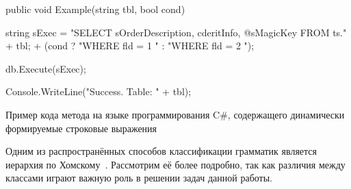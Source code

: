 \begin{listing}
    \begin{pyglist}[language=csharp,numbers=left,numbersep=5pt]

public void Example(string tbl, bool cond)
{
    string sExec =
        "SELECT sOrderDescription, cderitInfo, @sMagicKey FROM ts."
        + tbl;
        + (cond ? "WHERE fld = 1 " : "WHERE fld = 2 ");

    db.Execute(sExec);
    
    Console.WriteLine("Success. Table: " + tbl);
}
\end{pyglist}
\caption{Пример кода метода на языке программирования C\#, содержащего динамически формируемые строковые выражения}
\label{lst:stringExpr}
\end{listing}

Одним из распространённых способов классификации грамматик является иерархия по Хомскому~\cite{chomsky}. Рассмотрим её более подробно, так как различия между классами играют важную роль в решении задач данной работы.

